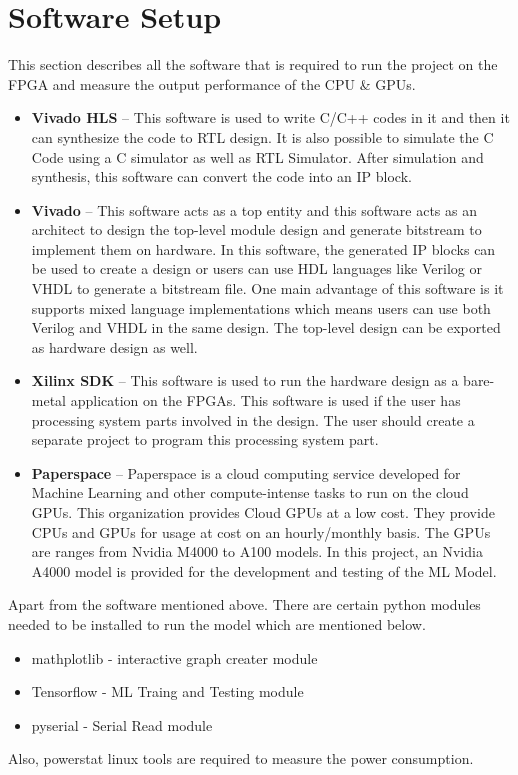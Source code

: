 \documentclass[a4paper,12pt,oneside]{book}
\begin{document}
\section{Software Setup}
\label{setup}
This section describes all the software that is required to run the project on the FPGA and measure the output performance of the CPU \& GPUs.
\begin{itemize}
    \item \textbf{Vivado HLS} – This software is used to write C/C++ codes in it and then it can synthesize the code to RTL design. It is also possible to simulate the C Code using a C simulator as well as RTL Simulator. After simulation and synthesis, this software can convert the code into an IP block.
    \item \textbf{Vivado} – This software acts as a top entity and this software acts as an architect to design the top-level module design and generate bitstream to implement them on hardware. In this software, the generated IP blocks can be used to create a design or users can use HDL languages like Verilog or VHDL to generate a bitstream file. One main advantage of this software is it supports mixed language implementations which means users can use both Verilog and VHDL in the same design. The top-level design can be exported as hardware design as well.
    \item \textbf{Xilinx SDK} – This software is used to run the hardware design as a bare-metal application on the FPGAs. This software is used if the user has processing system parts involved in the design. The user should create a separate project to program this processing system part.
    \item \textbf{Paperspace} – Paperspace is a cloud computing service developed for Machine Learning and other compute-intense tasks to run on the cloud GPUs. This organization provides Cloud GPUs at a low cost. They provide CPUs and GPUs for usage at cost on an hourly/monthly basis. The GPUs are ranges from Nvidia M4000 to A100 models. In this project, an Nvidia A4000 model is provided for the development and testing of the ML Model.
\end{itemize}
Apart from the software mentioned above. There are certain python modules needed to be installed to run the model which are mentioned below.
\begin{itemize}
    \item mathplotlib - interactive graph creater module
    \item Tensorflow - ML Traing and Testing module
    \item pyserial - Serial Read module
\end{itemize}
Also, powerstat linux tools are required to measure the power consumption.
\end{document}
